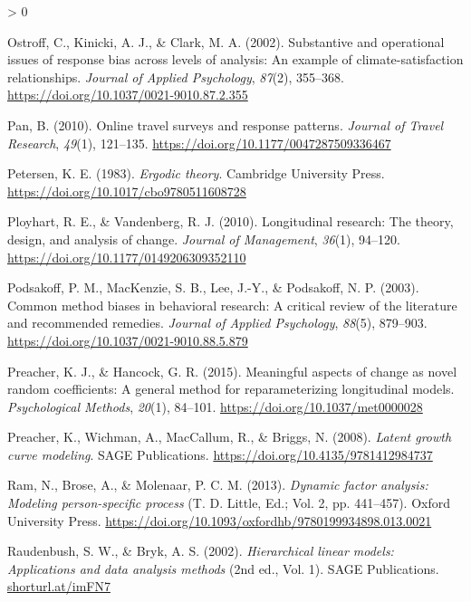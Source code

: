 \documentclass[
12pt, %
twoside,
english]{guelphthesis}
\newlength{\cslhangindent}
\newenvironment{CSLReferences}[2] %
 {%
  \setlength{\parindent}{0pt}
  \ifodd #1 \everypar{\setlength{\hangindent}{\cslhangindent}}\ignorespaces\fi
  \ifnum #2 > 0
  \setlength{\parskip}{\linespacing{2}}
  \fi
 }%
 {}
\theoremstyle{definition}
\theoremstyle{definition}
\theoremstyle{definition}
\theoremstyle{definition}
\theoremstyle{remark}
\begin{document}
\begin{CSLReferences}{1}{0}
\leavevmode{}%
Ostroff, C., Kinicki, A. J., \& Clark, M. A. (2002). Substantive and operational issues of response bias across levels of analysis: An example of climate-satisfaction relationships. \emph{Journal of Applied Psychology}, \emph{87}(2), 355--368. \url{https://doi.org/10.1037/0021-9010.87.2.355}

\leavevmode{}%
Pan, B. (2010). Online travel surveys and response patterns. \emph{Journal of Travel Research}, \emph{49}(1), 121--135. \url{https://doi.org/10.1177/0047287509336467}

\leavevmode{}%
Petersen, K. E. (1983). \emph{Ergodic theory}. Cambridge University Press. \url{https://doi.org/10.1017/cbo9780511608728}

\leavevmode{}%
Ployhart, R. E., \& Vandenberg, R. J. (2010). Longitudinal research: The theory, design, and analysis of change. \emph{Journal of Management}, \emph{36}(1), 94--120. \url{https://doi.org/10.1177/0149206309352110}

\leavevmode{}%
Podsakoff, P. M., MacKenzie, S. B., Lee, J.-Y., \& Podsakoff, N. P. (2003). Common method biases in behavioral research: A critical review of the literature and recommended remedies. \emph{Journal of Applied Psychology}, \emph{88}(5), 879--903. \url{https://doi.org/10.1037/0021-9010.88.5.879}

\leavevmode{}%
Preacher, K. J., \& Hancock, G. R. (2015). Meaningful aspects of change as novel random coefficients: A general method for reparameterizing longitudinal models. \emph{Psychological Methods}, \emph{20}(1), 84--101. \url{https://doi.org/10.1037/met0000028}

\leavevmode{}%
Preacher, K., Wichman, A., MacCallum, R., \& Briggs, N. (2008). \emph{Latent growth curve modeling}. SAGE Publications. \url{https://doi.org/10.4135/9781412984737}

\leavevmode{}%
Ram, N., Brose, A., \& Molenaar, P. C. M. (2013). \emph{Dynamic factor analysis: Modeling person-specific process} (T. D. Little, Ed.; Vol. 2, pp. 441--457). Oxford University Press. \url{https://doi.org/10.1093/oxfordhb/9780199934898.013.0021}

\leavevmode{}%
Raudenbush, S. W., \& Bryk, A. S. (2002). \emph{Hierarchical linear models: Applications and data analysis methods} (2nd ed., Vol. 1). SAGE Publications. \href{https://shorturl.at/imFN7}{shorturl.at/imFN7}


\end{CSLReferences}
\end{document}
